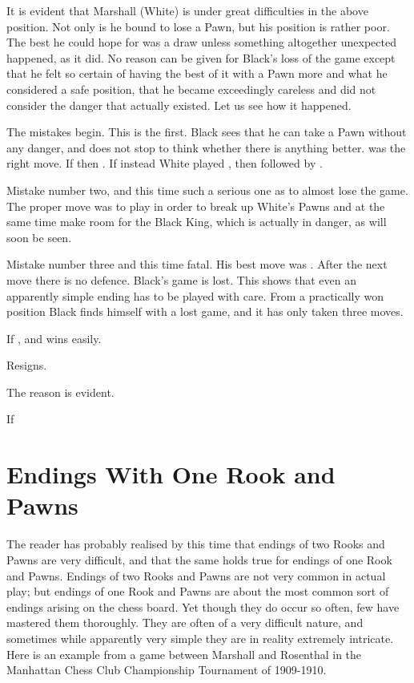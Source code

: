 \documentclass[11pt,a4paper]{book}
\begin{document}
It is evident that Marshall (White) is under great difficulties in the above position. Not only is he bound to lose a Pawn, but his position is rather poor. The best he could hope for was a draw unless something altogether unexpected happened, as it did. No reason can be given for Black's loss of the game except that he felt so certain of having the best of it with a Pawn more and what he considered a safe position, that he became exceedingly careless and did not consider the danger that actually existed. Let us see how it happened.

 The mistakes begin. This is the first. Black sees that he can take a Pawn without any danger, and does not stop to think whether there is anything better.  was the right move. If then . If instead White played , then followed by .

 Mistake number two, and this time such a serious one as to almost lose the game. The proper move was to play  in order to break up White's Pawns and at the same time make room for the Black King, which is actually in danger, as will soon be seen.


 Mistake number three and this time fatal. His best move was . After the next move there is no defence. Black's game is lost. This shows that even an apparently simple ending has to be played with care. From a practically won position Black finds himself with a lost game, and it has only taken three moves.

 If , and wins easily.

 Resigns.

The reason is evident. 

If 

\section{Endings With One Rook and Pawns}

The reader has probably realised by this time that endings of two Rooks and Pawns are very difficult, and that the same holds true for endings of one Rook and Pawns. Endings of two Rooks and Pawns are not very common in actual play; but endings of one Rook and Pawns are about the most common sort of endings arising on the chess board. Yet though they do occur so often, few have mastered them thoroughly. They are often of a very difficult nature, and sometimes while apparently very simple they are in reality extremely intricate. Here is an example from a game between Marshall and Rosenthal in the Manhattan Chess Club Championship Tournament of 1909-1910.
\end{document}
